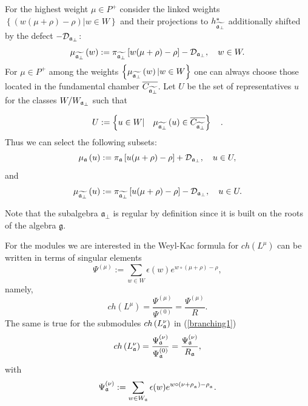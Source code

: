 \documentclass[12pt]{article}
\theoremstyle{definition}
\newcommand{\gf}{\mathfrak{g}}
\newcommand{\afb}{\mathfrak{a}_{\bot}}
\begin{document}
For the highest weight $\mu \in P^{+}$ consider the linked weights $\left\{
\left( w(\mu +\rho )-\rho \right) |w\in W\right\} $ and their projections to 
$h_{\widetilde{\frak{a}_{\perp }}}^{\ast }$ additionally shifted by the
defect $-\mathcal{D}_{\frak{a}_{\perp }}$: 
\[
\mu _{\widetilde{\frak{a}_{\perp }}}\left( w\right) :=\pi _{\widetilde{\frak{%
a}_{\perp }}}\left[ w(\mu +\rho )-\rho \right] -\mathcal{D}_{\frak{a}_{\perp
}},\quad w\in W. 
\]
For $\mu \in P^{+}$ among the weights $\left\{ \mu _{\widetilde{\frak{a}%
_{\perp }}}\left( w\right) |w\in W\right\} $ one can always choose those
located in the fundamental chamber $\overline{C_{\widetilde{\frak{a}_{\perp }%
}}}$. Let $U$ be the set of representatives $u$ for the classes $W/W_{\frak{a%
}_{\perp }}$ such that

\begin{equation}
U:=\left\{ u\in W|\quad \mu _{\widetilde{\frak{a}_{\perp }}}\left( u\right)
\in \overline{C_{\widetilde{\frak{a}_{\perp }}}}\right\} \quad .
\label{U-def}
\end{equation}
Thus we can select the following subsets:
\begin{equation}
\mu _{\frak{a}}\left( u\right) :=\pi _{\frak{a}}\left[ u(\mu +\rho )-\rho %
\right] +\mathcal{D}_{\frak{a}_{\perp }},\quad u\in U,  \label{mu-a}
\end{equation}
and
\begin{equation}
\mu _{\widetilde{\frak{a}_{\perp }}}\left( u\right) :=\pi _{\widetilde{\frak{%
a}_{\perp }}}\left[ u(\mu +\rho )-\rho \right] -\mathcal{D}_{\frak{a}_{\perp
}},\quad u\in U.  \label{mu-a-tilda}
\end{equation}

Note that the subalgebra $\afb$ is regular by definition since it is built on the roots of the
algebra $\gf$.

For the modules we are interested in the Weyl-Kac formula for $ch\left( L^{\mu }\right) $ can be
written in terms of
singular elements \cite{humphreys1997introduction}
\[
\Psi ^{\left( \mu \right) }:=\sum\limits_{w\in W}\epsilon (w)e^{w\circ (\mu
+\rho )-\rho },
\]
namely,
\begin{equation}
ch\left( L^{\mu }\right) =\frac{\Psi ^{\left( \mu \right) }}{\Psi ^{\left(
0\right) }}=\frac{\Psi ^{\left( \mu \right) }}{R}.  \label{Weyl-Kac2}
\end{equation}
The same is true for the submodules $ch\left( L_{\frak{a}}^{\nu }\right) $
in (\ref{branching1})
\[
ch\left( L_{\frak{a}}^{\nu }\right) =\frac{\Psi _{\frak{a}}^{\left( \nu
\right) }}{\Psi _{\frak{a}}^{\left( 0\right) }}=\frac{\Psi _{\frak{a}%
}^{\left( \nu \right) }}{R_{\frak{a}}}, 
\]
with 
\[
\Psi _{\frak{a}}^{\left( \nu \right) }:=\sum\limits_{w\in W_{\frak{a}%
}}\epsilon (w)e^{w\circ (\nu +\rho _{_{\frak{a}}})-\rho _{_{\frak{a}}}}. 
\]
\end{document}
